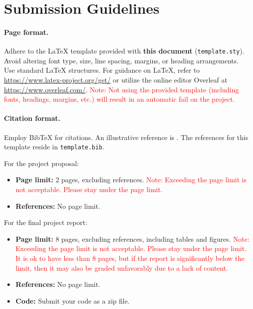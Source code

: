 \documentclass{article}
\begin{document}
\section{Submission Guidelines}
\paragraph{Page format.} Adhere to the LaTeX template provided with \textbf{this document} (\texttt{template.sty}). Avoid altering font type, size, line spacing, margins, or heading arrangements. Use standard LaTeX structures. For guidance on LaTeX, refer to \url{https://www.latex-project.org/get/} or utilize the online editor Overleaf at \url{https://www.overleaf.com/}. \textcolor{red}{Note: Not using the provided template (including fonts, headings, margins, etc.) will result in an automatic fail on the project.}

\paragraph{Citation format.} Employ BibTeX for citations. An illustrative reference is \cite{vaswani2017attention}. The references for this template reside in \texttt{template.bib}.

For the project proposal:
\begin{itemize}
  \item \textbf{Page limit:} 2 pages, excluding references. \textcolor{red}{Note: Exceeding the page limit is not acceptable. Please stay under the page limit.}
  \item \textbf{References:} No page limit.
\end{itemize}

For the final project report:
\begin{itemize}
  \item \textbf{Page limit:} 8 pages, excluding references, including tables and figures. \textcolor{red}{Note: Exceeding the page limit is not acceptable. Please stay under the page limit. It is ok to have less than 8 pages, but if the report is significantly below the limit, then it may also be graded unfavorably due to a lack of content.}
  \item \textbf{References:} No page limit.
  \item \textbf{Code:} Submit your code as a zip file.
\end{itemize}
\end{document}
